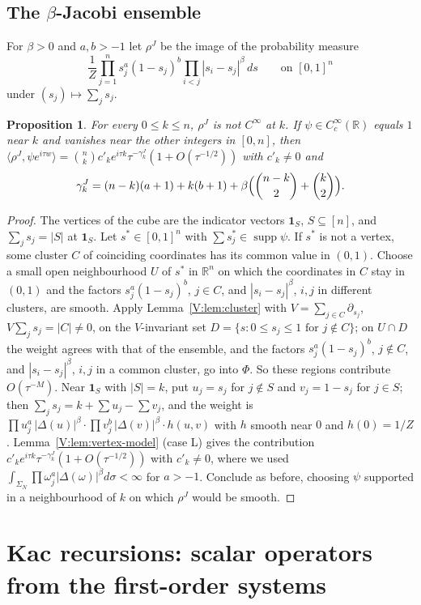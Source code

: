 \documentclass[11pt,a4paper]{article}
\newtheorem{proposition}[theorem]{Proposition}
\theoremstyle{definition}
\theoremstyle{remark}
\newcommand{\R}{\mathbb R}
\DeclareMathOperator{\supp}{supp}
\numberwithin{equation}{section}
\begin{document}
\subsection{The \texorpdfstring{$\beta$}{beta}-Jacobi ensemble}
For $\beta>0$ and $a,b>-1$ let $\rho^{J}$ be the image of the probability measure
\[
\frac1{Z}\prod_{j=1}^{n}s_j^{a}(1-s_j)^{b}\prod_{i<j}|s_i-s_j|^\beta\,ds\qquad\text{on }[0,1]^n
\]
under $(s_j)\mapsto\sum_js_j$.

\begin{proposition}\label{V:prop:vis-jac}
For every $0\le k\le n$, $\rho^J$ is not $C^\infty$ at $k$. If $\psi\in C^\infty_c(\R)$ equals $1$ near $k$ and vanishes near the other integers in $[0,n]$, then $\langle\rho^J,\psi e^{i\tau w}\rangle=\binom nk c'_ke^{i\tau k}\tau^{-\gamma^J_k}(1+O(\tau^{-1/2}))$ with $c'_k\ne0$ and
\[
\gamma^J_k=(n-k)(a+1)+k(b+1)+\beta\Bigl(\binom{n-k}2+\binom k2\Bigr).
\]
\end{proposition}

\begin{proof}
The vertices of the cube are the indicator vectors $\mathbf 1_S$, $S\subseteq[n]$, and $\sum_js_j=|S|$ at $\mathbf 1_S$. Let $s^*\in[0,1]^n$ with $\sum s^*_j\in\supp\psi$. If $s^*$ is not a vertex, some cluster $C$ of coinciding coordinates has its common value in $(0,1)$. Choose a small open neighbourhood $U$ of $s^*$ in $\R^n$ on which the coordinates in $C$ stay in $(0,1)$ and the factors $s_j^a(1-s_j)^b$, $j\in C$, and $|s_i-s_j|^\beta$, $i,j$ in different clusters, are smooth. Apply Lemma~\ref{V:lem:cluster} with $V=\sum_{j\in C}\partial_{s_j}$, $V\sum_js_j=|C|\ne0$, on the $V$-invariant set $D=\{s:0\le s_j\le1\text{ for }j\notin C\}$; on $U\cap D$ the weight agrees with that of the ensemble, and the factors $s_j^a(1-s_j)^b$, $j\notin C$, and $|s_i-s_j|^\beta$, $i,j$ in a common cluster, go into $\Phi$. So these regions contribute $O(\tau^{-M})$. Near $\mathbf 1_S$ with $|S|=k$, put $u_j=s_j$ for $j\notin S$ and $v_j=1-s_j$ for $j\in S$; then $\sum_js_j=k+\sum u_j-\sum v_j$, and the weight is $\prod u_j^a\,|\Delta(u)|^\beta\cdot\prod v_j^b\,|\Delta(v)|^\beta\cdot h(u,v)$ with $h$ smooth near $0$ and $h(0)=1/Z$. Lemma~\ref{V:lem:vertex-model} (case L) gives the contribution $c'_ke^{i\tau k}\tau^{-\gamma^J_k}(1+O(\tau^{-1/2}))$ with $c'_k\ne0$, where we used $\int_{\Sigma_N}\prod\omega_j^a|\Delta(\omega)|^\beta d\sigma<\infty$ for $a>-1$. Conclude as before, choosing $\psi$ supported in a neighbourhood of $k$ on which $\rho^J$ would be smooth.
\end{proof}
\section{Kac recursions: scalar operators from the first-order systems}\label{V:sec:sys}
\end{document}
